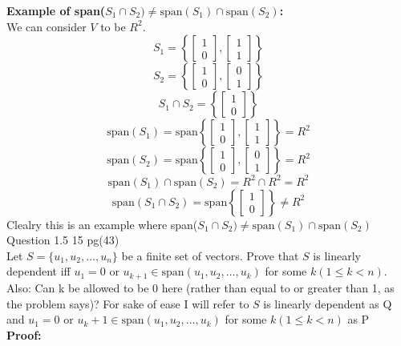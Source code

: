 \documentclass[answers,12pt,addpoints]{exam}
\begin{document}
\begin{questions}
\textbf{Example of span($S_1 \cap S_2) \neq \text{span}(S_1) \cap \text{span}(S_2)$:}\\
We can consider $V$ to be $R^2$.\\
$$S_1 = \left\{ \begin{bmatrix}
    1\\
    0
\end{bmatrix} ,\begin{bmatrix}
    1\\
    1
\end{bmatrix}\right\}$$
$$S_2 = \left\{ \begin{bmatrix}
    1\\
    0
\end{bmatrix} ,\begin{bmatrix}
    0\\
    1
\end{bmatrix}\right\}$$
$$S_1 \cap S_2 = \left\{ \begin{bmatrix}
    1\\
    0
\end{bmatrix}\right\}$$
$$\text{span}(S_1) = \text{span}\left\{ \begin{bmatrix}
    1\\
    0
\end{bmatrix} ,\begin{bmatrix}
    1\\
    1
\end{bmatrix}\right\} = R^2$$
$$\text{span}(S_2) = \text{span}\left\{ \begin{bmatrix}
    1\\
    0
\end{bmatrix} ,\begin{bmatrix}
    0\\
    1
\end{bmatrix}\right\} = R^2$$
$$\text{span}(S_1) \cap \text{span}(S_2) = R^2 \cap R^2 = R^2$$
$$\text{span}(S_1 \cap S_2) = \text{span}\left\{ \begin{bmatrix}
    1\\
    0
\end{bmatrix}\right\} \neq R^2$$
Clealry this is an example where span($S_1 \cap S_2) \neq \text{span}(S_1) \cap \text{span}(S_2)$\\


\question Question 1.5 15 pg(43)\\
Let $S = \{u_1,u_2,\dots, u_n\}$ be a finite set of vectors. Prove that $S$ is linearly dependent iff $u_1 = 0$ or $u_{k+1} \in \text{span}(u_1,u_2,\dots,u_k)$ for some $k (1 \leq k < n)$.\\
Also: Can k be allowed to be 0 here (rather than equal to or greater than 1, as the problem says)?
For sake of ease I will refer to $S$ is linearly dependent as Q and $u_1 = 0$ or $u_k+1 \in \text{span}(u_1,u_2,\dots,u_k)$ for some $k (1 \leq k < n)$ as P \\
\textbf{Proof:}\\


\end{questions}
\end{document}
